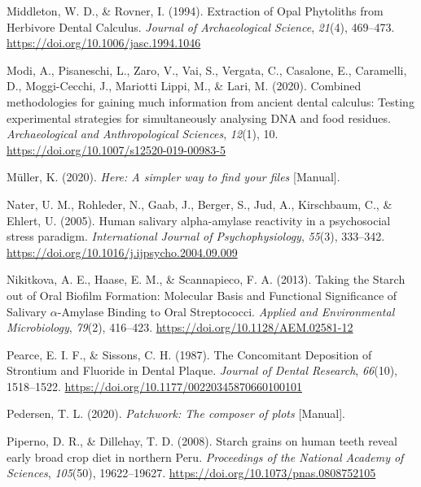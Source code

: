 \documentclass[
  b5paper,
]{book}
\newlength{\cslhangindent}
\newenvironment{CSLReferences}[2] %
 {\begin{list}{}{%
  \setlength{\itemindent}{0pt}
  \setlength{\leftmargin}{0pt}
  \setlength{\parsep}{0pt}
  \ifodd #1
   \setlength{\leftmargin}{\cslhangindent}
   \setlength{\itemindent}{-1\cslhangindent}
  \fi
  \setlength{\itemsep}{#2\baselineskip}}}
 {\end{list}}
\begin{document}
\begin{CSLReferences}{1}{0}
Middleton, W. D., \& Rovner, I. (1994). Extraction of {Opal Phytoliths}
from {Herbivore Dental Calculus}. \emph{Journal of Archaeological
Science}, \emph{21}(4), 469--473.
\url{https://doi.org/10.1006/jasc.1994.1046}

Modi, A., Pisaneschi, L., Zaro, V., Vai, S., Vergata, C., Casalone, E.,
Caramelli, D., Moggi-Cecchi, J., Mariotti Lippi, M., \& Lari, M. (2020).
Combined methodologies for gaining much information from ancient dental
calculus: Testing experimental strategies for simultaneously analysing
{DNA} and food residues. \emph{Archaeological and Anthropological
Sciences}, \emph{12}(1), 10.
\url{https://doi.org/10.1007/s12520-019-00983-5}

Müller, K. (2020). \emph{Here: {A} simpler way to find your files}
{[}Manual{]}.

Nater, U. M., Rohleder, N., Gaab, J., Berger, S., Jud, A., Kirschbaum,
C., \& Ehlert, U. (2005). Human salivary alpha-amylase reactivity in a
psychosocial stress paradigm. \emph{International Journal of
Psychophysiology}, \emph{55}(3), 333--342.
\url{https://doi.org/10.1016/j.ijpsycho.2004.09.009}

Nikitkova, A. E., Haase, E. M., \& Scannapieco, F. A. (2013). Taking the
{Starch} out of {Oral Biofilm Formation}: {Molecular Basis} and
{Functional Significance} of {Salivary} {\(\alpha\)}-{Amylase Binding}
to {Oral Streptococci}. \emph{Applied and Environmental Microbiology},
\emph{79}(2), 416--423. \url{https://doi.org/10.1128/AEM.02581-12}

Pearce, E. I. F., \& Sissons, C. H. (1987). The {Concomitant Deposition}
of {Strontium} and {Fluoride} in {Dental Plaque}. \emph{Journal of
Dental Research}, \emph{66}(10), 1518--1522.
\url{https://doi.org/10.1177/00220345870660100101}

Pedersen, T. L. (2020). \emph{Patchwork: {The} composer of plots}
{[}Manual{]}.

Piperno, D. R., \& Dillehay, T. D. (2008). Starch grains on human teeth
reveal early broad crop diet in northern {Peru}. \emph{Proceedings of
the National Academy of Sciences}, \emph{105}(50), 19622--19627.
\url{https://doi.org/10.1073/pnas.0808752105}


\end{CSLReferences}
\end{document}
